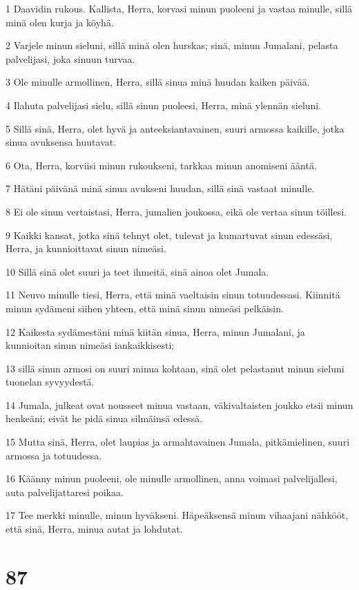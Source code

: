 \par 1 Daavidin rukous. Kallista, Herra, korvasi minun puoleeni ja vastaa minulle, sillä minä olen kurja ja köyhä.
\par 2 Varjele minun sieluni, sillä minä olen hurskas; sinä, minun Jumalani, pelasta palvelijasi, joka sinuun turvaa.
\par 3 Ole minulle armollinen, Herra, sillä sinua minä huudan kaiken päivää.
\par 4 Ilahuta palvelijasi sielu, sillä sinun puoleesi, Herra, minä ylennän sieluni.
\par 5 Sillä sinä, Herra, olet hyvä ja anteeksiantavainen, suuri armossa kaikille, jotka sinua avuksensa huutavat.
\par 6 Ota, Herra, korviisi minun rukoukseni, tarkkaa minun anomiseni ääntä.
\par 7 Hätäni päivänä minä sinua avukseni huudan, sillä sinä vastaat minulle.
\par 8 Ei ole sinun vertaistasi, Herra, jumalien joukossa, eikä ole vertaa sinun töillesi.
\par 9 Kaikki kansat, jotka sinä tehnyt olet, tulevat ja kumartuvat sinun edessäsi, Herra, ja kunnioittavat sinun nimeäsi.
\par 10 Sillä sinä olet suuri ja teet ihmeitä, sinä ainoa olet Jumala.
\par 11 Neuvo minulle tiesi, Herra, että minä vaeltaisin sinun totuudessasi. Kiinnitä minun sydämeni siihen yhteen, että minä sinun nimeäsi pelkäisin.
\par 12 Kaikesta sydämestäni minä kiitän sinua, Herra, minun Jumalani, ja kunnioitan sinun nimeäsi iankaikkisesti;
\par 13 sillä sinun armosi on suuri minua kohtaan, sinä olet pelastanut minun sieluni tuonelan syvyydestä.
\par 14 Jumala, julkeat ovat nousseet minua vastaan, väkivaltaisten joukko etsii minun henkeäni; eivät he pidä sinua silmäinsä edessä.
\par 15 Mutta sinä, Herra, olet laupias ja armahtavainen Jumala, pitkämielinen, suuri armossa ja totuudessa.
\par 16 Käänny minun puoleeni, ole minulle armollinen, anna voimasi palvelijallesi, auta palvelijattaresi poikaa.
\par 17 Tee merkki minulle, minun hyväkseni. Häpeäksensä minun vihaajani nähkööt, että sinä, Herra, minua autat ja lohdutat.

\chapter{87}

